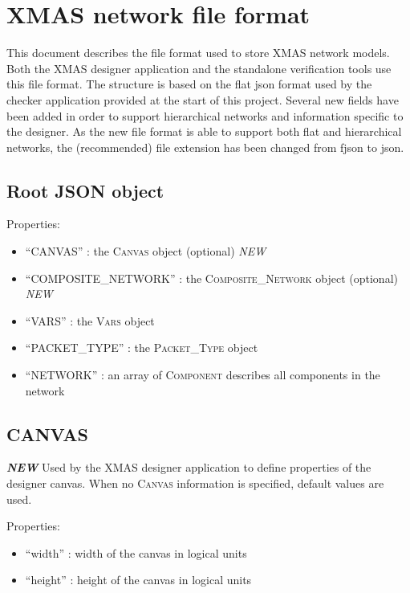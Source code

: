 \section{XMAS network file format}\label{xmas-network-file-format}

This document describes the file format used to store XMAS network
models. Both the XMAS designer application and the standalone
verification tools use this file format. The structure is based on the
flat json format used by the checker application provided at the start
of this project. Several new fields have been added in order to support
hierarchical networks and information specific to the designer. As the
new file format is able to support both flat and hierarchical networks,
the (recommended) file extension has been changed from fjson to json.

\subsection{Root JSON object}\label{root-json-object}

Properties:

\begin{itemize}
\itemsep1pt\parskip0pt
\item
  ``CANVAS'' : the \textsc{Canvas} object (optional) \emph{NEW}
\item
  ``COMPOSITE\_NETWORK'' : the \textsc{Composite\_Network} object (optional)
  \emph{NEW}
\item
  ``VARS'' : the \textsc{Vars} object
\item
  ``PACKET\_TYPE'' : the \textsc{Packet\_Type} object
\item
  ``NETWORK'' : an array of \textsc{Component} describes all components in
  the network
\end{itemize}

\subsection{CANVAS}\label{canvas}

\textbf{\emph{NEW}} Used by the XMAS designer application to define
properties of the designer canvas. When no \textsc{Canvas} information is
specified, default values are used.

Properties:

\begin{itemize}
\itemsep1pt\parskip0pt
\item
  ``width'' : width of the canvas in logical units
\item
  ``height'' : height of the canvas in logical units
\end{itemize}

